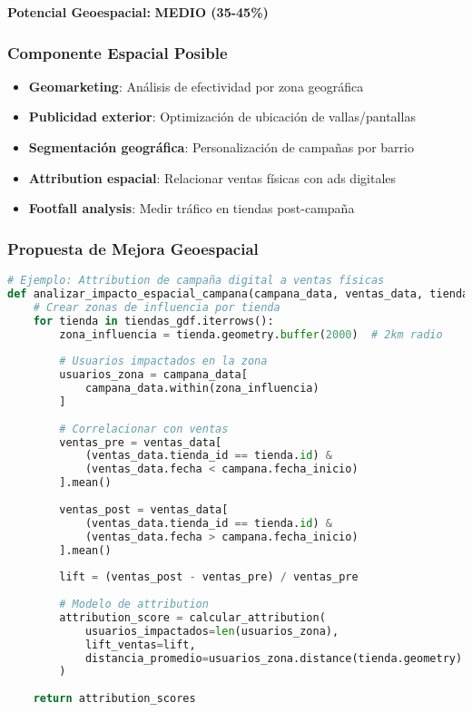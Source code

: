 \documentclass[11pt,a4paper]{article}
\newcommand{\medio}[1]{\textcolor{amarillo}{\textbf{#1}}}
\begin{document}
\begin{tcolorbox}[colframe=amarillo,colback=yellow!10]
\textbf{Potencial Geoespacial:} \medio{MEDIO (35-45\%)}
\end{tcolorbox}

\subsubsection{Componente Espacial Posible}

\begin{itemize}
    \item \textbf{Geomarketing}: Análisis de efectividad por zona geográfica
    \item \textbf{Publicidad exterior}: Optimización de ubicación de vallas/pantallas
    \item \textbf{Segmentación geográfica}: Personalización de campañas por barrio
    \item \textbf{Attribution espacial}: Relacionar ventas físicas con ads digitales
    \item \textbf{Footfall analysis}: Medir tráfico en tiendas post-campaña
\end{itemize}

\subsubsection{Propuesta de Mejora Geoespacial}


\begin{lstlisting}[language=Python,basicstyle=\tiny]
# Ejemplo: Attribution de campaña digital a ventas físicas
def analizar_impacto_espacial_campana(campana_data, ventas_data, tiendas_gdf):
    # Crear zonas de influencia por tienda
    for tienda in tiendas_gdf.iterrows():
        zona_influencia = tienda.geometry.buffer(2000)  # 2km radio
        
        # Usuarios impactados en la zona
        usuarios_zona = campana_data[
            campana_data.within(zona_influencia)
        ]
        
        # Correlacionar con ventas
        ventas_pre = ventas_data[
            (ventas_data.tienda_id == tienda.id) & 
            (ventas_data.fecha < campana.fecha_inicio)
        ].mean()
        
        ventas_post = ventas_data[
            (ventas_data.tienda_id == tienda.id) & 
            (ventas_data.fecha > campana.fecha_inicio)
        ].mean()
        
        lift = (ventas_post - ventas_pre) / ventas_pre
        
        # Modelo de attribution
        attribution_score = calcular_attribution(
            usuarios_impactados=len(usuarios_zona),
            lift_ventas=lift,
            distancia_promedio=usuarios_zona.distance(tienda.geometry).mean()
        )
    
    return attribution_scores
\end{lstlisting}
\end{document}
